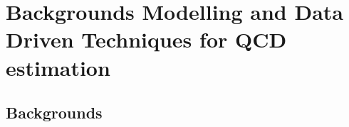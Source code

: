 \graphicspath{{chapt_dutch/}{intro/}{chapt2/}{chapt3/}{chapt4/}{chapt5/}{chapt6/}{chapt7/}{chapt8/}}

\renewcommand\evenpagerightmark{{\scshape\small Chapter 6}}
\renewcommand\oddpageleftmark{{\scshape\small Backgrounds Modelling and Data Driven Techniques for QCD estimation}}

\hyphenation{}

\chapter[Backgrounds Modelling and Data Driven Techniques for QCD estimation]%
{Backgrounds Modelling and Data Driven Techniques for QCD estimation}
\label{chapt:7}

\section{Backgrounds}
\label{sec:bkgs}

